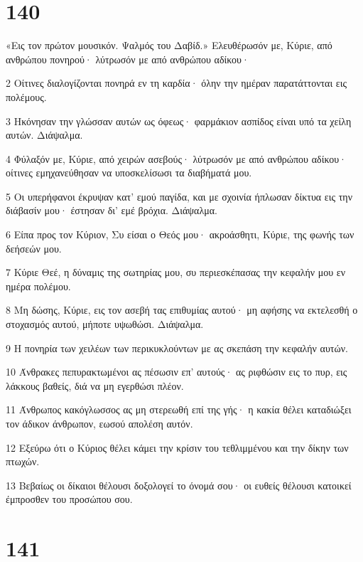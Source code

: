 \chapter{140}

\par «Εις τον πρώτον μουσικόν. Ψαλμός του Δαβίδ.» Ελευθέρωσόν με, Κύριε, από ανθρώπου πονηρού· λύτρωσόν με από ανθρώπου αδίκου·
\par 2 Οίτινες διαλογίζονται πονηρά εν τη καρδία· όλην την ημέραν παρατάττονται εις πολέμους.
\par 3 Ηκόνησαν την γλώσσαν αυτών ως όφεως· φαρμάκιον ασπίδος είναι υπό τα χείλη αυτών. Διάψαλμα.
\par 4 Φύλαξόν με, Κύριε, από χειρών ασεβούς· λύτρωσόν με από ανθρώπου αδίκου· οίτινες εμηχανεύθησαν να υποσκελίσωσι τα διαβήματά μου.
\par 5 Οι υπερήφανοι έκρυψαν κατ' εμού παγίδα, και με σχοινία ήπλωσαν δίκτυα εις την διάβασίν μου· έστησαν δι' εμέ βρόχια. Διάψαλμα.
\par 6 Είπα προς τον Κύριον, Συ είσαι ο Θεός μου· ακροάσθητι, Κύριε, της φωνής των δεήσεών μου.
\par 7 Κύριε Θεέ, η δύναμις της σωτηρίας μου, συ περιεσκέπασας την κεφαλήν μου εν ημέρα πολέμου.
\par 8 Μη δώσης, Κύριε, εις τον ασεβή τας επιθυμίας αυτού· μη αφήσης να εκτελεσθή ο στοχασμός αυτού, μήποτε υψωθώσι. Διάψαλμα.
\par 9 Η πονηρία των χειλέων των περικυκλούντων με ας σκεπάση την κεφαλήν αυτών.
\par 10 Άνθρακες πεπυρακτωμένοι ας πέσωσιν επ' αυτούς· ας ριφθώσιν εις το πυρ, εις λάκκους βαθείς, διά να μη εγερθώσι πλέον.
\par 11 Άνθρωπος κακόγλωσσος ας μη στερεωθή επί της γής· η κακία θέλει καταδιώξει τον άδικον άνθρωπον, εωσού απολέση αυτόν.
\par 12 Εξεύρω ότι ο Κύριος θέλει κάμει την κρίσιν του τεθλιμμένου και την δίκην των πτωχών.
\par 13 Βεβαίως οι δίκαιοι θέλουσι δοξολογεί το όνομά σου· οι ευθείς θέλουσι κατοικεί έμπροσθεν του προσώπου σου.

\chapter{141}

